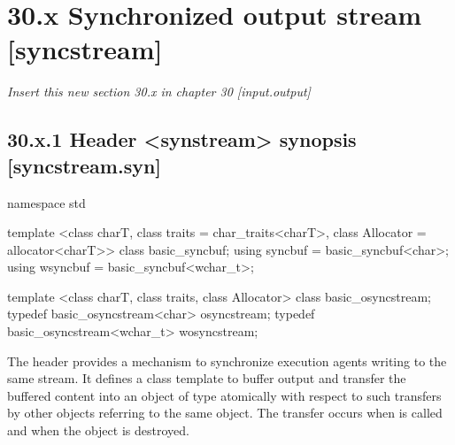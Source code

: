 \documentclass[ebook,11pt,article]{memoir}
\begin{document}
\section{30.x Synchronized output stream [syncstream]}
\emph{Insert this new section 30.x in chapter 30 [input.output] }
\subsection{30.x.1 Header <synstream> synopsis [syncstream.syn]}
\begin{addedblock}
\begin{codeblock}
namespace std {
template <class charT,
          class traits = char_traits<charT>,
          class Allocator = allocator<charT>>
  class basic_syncbuf;
using syncbuf  = basic_syncbuf<char>;
using wsyncbuf = basic_syncbuf<wchar_t>;

template <class charT,
          class traits,
          class Allocator>
  class basic_osyncstream;
typedef basic_osyncstream<char> osyncstream;
typedef basic_osyncstream<wchar_t> wosyncstream; 
}
\end{codeblock}
\end{addedblock}

\begin{addedblock}
The header  provides a mechanism to synchronize execution agents writing to the same stream. 
It defines a class template  to buffer output and transfer the buffered content into an object of type  atomically with respect to such transfers by other  objects referring to the same  object. The transfer occurs when  is called and when the  object is destroyed.


\end{addedblock}
\end{document}
